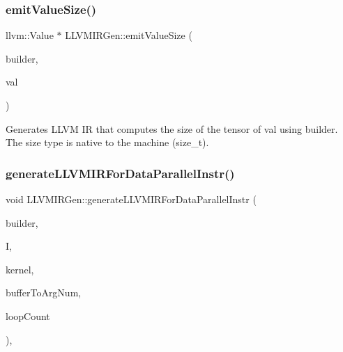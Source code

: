 \subsubsection{\texorpdfstring{emit\+Value\+Size()}{emitValueSize()}}
{\footnotesize\ttfamily llvm\+::\+Value $\ast$ L\+L\+V\+M\+I\+R\+Gen\+::emit\+Value\+Size (\begin{DoxyParamCaption}\item[{llvm\+::\+I\+R\+Builder$<$$>$ \&}]{builder,  }\item[{const \hyperlink{classglow_1_1_value}{glow\+::\+Value} $\ast$}]{val }\end{DoxyParamCaption})\hspace{0.3cm}{\ttfamily [protected]}}

Generates L\+L\+VM IR that computes the size of the tensor of {\ttfamily val} using {\ttfamily builder}. The size type is native to the machine (size\+\_\+t). \mbox{\label{classglow_1_1_l_l_v_m_i_r_gen_a638e1a6f88ef525a57fa03c7c0cae7cc}} 
\subsubsection{\texorpdfstring{generate\+L\+L\+V\+M\+I\+R\+For\+Data\+Parallel\+Instr()}{generateLLVMIRForDataParallelInstr()}}
{\footnotesize\ttfamily void L\+L\+V\+M\+I\+R\+Gen\+::generate\+L\+L\+V\+M\+I\+R\+For\+Data\+Parallel\+Instr (\begin{DoxyParamCaption}\item[{llvm\+::\+I\+R\+Builder$<$$>$ \&}]{builder,  }\item[{const \hyperlink{classglow_1_1_instruction}{glow\+::\+Instruction} $\ast$}]{I,  }\item[{llvm\+::\+Function $\ast$}]{kernel,  }\item[{llvm\+::\+Dense\+Map$<$ \hyperlink{classglow_1_1_value}{Value} $\ast$, int $>$ \&}]{buffer\+To\+Arg\+Num,  }\item[{llvm\+::\+Value $\ast$}]{loop\+Count }\end{DoxyParamCaption})\hspace{0.3cm}{\ttfamily [protected]}, {\ttfamily [virtual]}}

